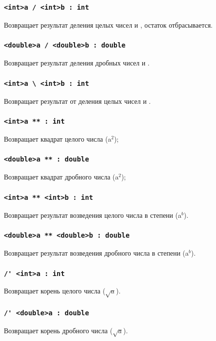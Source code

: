 \documentclass[a4paper, 14pt]{extarticle}
\begin{document}
\subsubsection{\lstinline`<int>a / <int>b : int`}
Возвращает результат деления целых чисел  и , остаток отбрасывается.

\subsubsection{\lstinline`<double>a / <double>b : double`}
Возвращает результат деления дробных чисел  и .

\subsubsection{\lstinline`<int>a \ <int>b : int`}
Возвращает результат от деления целых чисел  и .


\subsubsection{\lstinline`<int>a ** : int`}
Возвращает квадрат целого числа  (a$^2$);

\subsubsection{\lstinline`<double>a ** : double`}
Возвращает квадрат дробного числа  (a$^2$);

\subsubsection{\lstinline`<int>a ** <int>b : int`}
Возвращает результат возведения целого числа  в степени  (a$^b$).

\subsubsection{\lstinline`<double>a ** <double>b : double`}
Возвращает результат возведения дробного числа  в степени  (a$^b$).

\subsubsection{\lstinline`/' <int>a : int`}
Возвращает корень целого числа  ($\sqrt{a}$).

\subsubsection{\lstinline`/' <double>a : double`}
Возвращает корень дробного числа  ($\sqrt{a}$).
\end{document}

